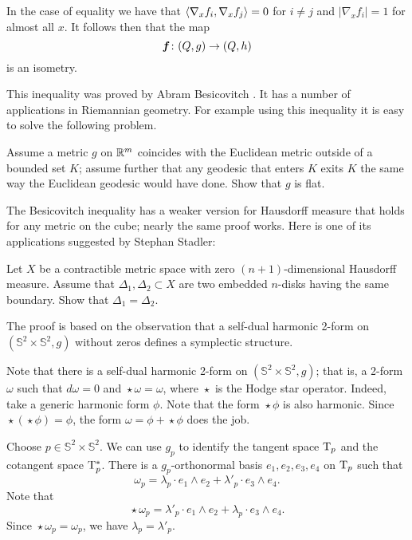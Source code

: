 In the case of equality we have that $\langle\nabla_x f_i,\nabla_x f_j\rangle=0$ for $i\ne j$ 
and $|\nabla_x f_i|=1$ for almost all $x$.
It follows then that the map 
\[\bm{f}\:(Q,g)\z\to (Q,h)\] 
is an isometry.
\qeds

This inequality was proved by Abram Besicovitch \cite{besicovitch}.
It has a number of applications in Riemannian geometry.
For example using this inequality it is easy to solve the following problem.

\begin{pr}
Assume a metric $g$ on $\mathbb{R}^m$ coincides with the Euclidean metric outside of a bounded set $K$;
assume further that any geodesic that enters $K$ exits $K$ the same way the Euclidean geodesic would have done. 
Show that $g$ is flat.
\end{pr}


The Besicovitch inequality has a weaker version for Hausdorff measure that holds for any metric on the cube;
nearly the same proof works.
Here is one of its applications suggested by Stephan Stadler:

\begin{pr}
Let $X$ be a contractible metric space with zero $(n+1)$-dimensional Hausdorff measure.
Assume that $\Delta_1,\Delta_2\subset X$ are two embedded $n$-disks having the same boundary.
Show that $\Delta_1=\Delta_2$.
\end{pr}



The proof is based on the observation that a self-dual harmonic 2-form on $(\mathbb{S}^2\times\mathbb{S}^2,g)$
without zeros defines a symplectic structure.

\medskip

Note that there is a self-dual harmonic 2-form on $(\mathbb{S}^2\times\mathbb{S}^2,g)$;
that is, a 2-form $\omega$ such that $d\omega=0$ and $\mathop{\star}\omega=\omega$,
where $\mathop{\star}$ is the Hodge star operator.
Indeed, take a generic harmonic form $\phi$.
Note that the form $\mathop{\star}\phi$ is also harmonic.
Since $\mathop{\star}(\mathop{\star}\phi)=\phi$,
the form $\omega=\phi+\mathop{\star}\phi$ does the job.

Choose $p\in \mathbb{S}^2\times\mathbb{S}^2$.
We can use $g_p$ to identify the tangent space $\mathrm{T}_p$ and the cotangent space $\mathrm{T}^*_p$.
There is a $g_p$-orthonormal basis $e_1, e_2, e_3, e_4$ on $\mathrm{T}_p$ such that 
\[\omega_p=\lambda_p\cdot e_1\wedge e_2+\lambda'_p\cdot  e_3\wedge e_4.\]
Note that 
\[\mathop{\star}\omega_p=\lambda'_p\cdot e_1\wedge e_2+\lambda_p\cdot  e_3\wedge e_4.\]
Since $\mathop{\star}\omega_p=\omega_p$, we have $\lambda_p=\lambda'_p$.

